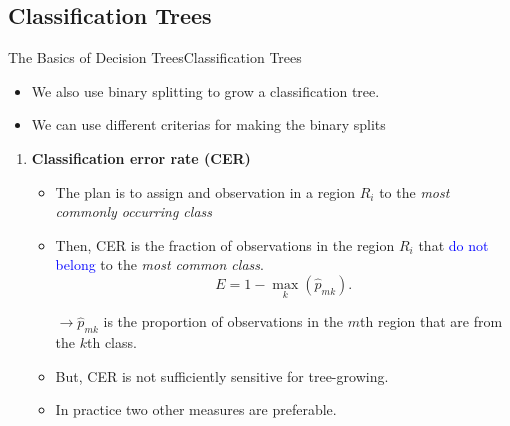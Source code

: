 \subsection{Classification Trees}
\begin{frame}{The Basics of Decision Trees}{Classification Trees}

\begin{itemize}
    \item We also use binary splitting to grow a classification tree. \pause
    \item We can use different criterias for making the binary splits \pause
\end{itemize}

\begin{enumerate}
    \item  \textbf{Classification error rate (CER)} \pause \\
    \begin{itemize}
        \item The plan is to assign and observation in a region $R_i$ to the \textit{most commonly occurring class} \pause

        \item Then, CER is the fraction of observations in the region $R_i$ that \textcolor{blue}{do not belong} to the \textit{most common class}. \pause 
        \begin{equation*}
        E = 1 - \max_k({\hat{p}_{mk}}).
        \end{equation*} \pause 

        $\rightarrow \hat{p}_{mk}$ is the proportion of observations in the $m$th region that are from the $k$th class. \pause 

        \item But, CER is not suﬃciently sensitive for tree-growing. \pause
        
        \item In practice two other measures are preferable.
    \end{itemize}
    
\end{enumerate}

\end{frame}

